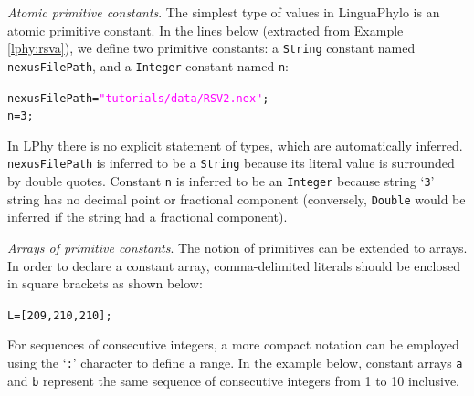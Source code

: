 \documentclass[10pt,letterpaper,table]{article}
\begin{document}
\noindent \emph{Atomic primitive constants}. The simplest type of
values in LinguaPhylo is an atomic primitive constant.
In the lines below (extracted from Example \ref{lphy:rsva}), we define
two primitive constants: a \texttt{String} constant named
\texttt{nexusFilePath}, and a \texttt{Integer} constant named
\texttt{n}:

{
\small
\begin{alltt}
  nexusFilePath = \textcolor{magenta}{"tutorials/data/RSV2.nex"};
  n = 3;
\end{alltt}
}

In LPhy there is no explicit statement of types, which are
automatically inferred.
\texttt{nexusFilePath} is inferred to be a \texttt{String} because its
literal value is surrounded by double quotes.
Constant \texttt{n} is inferred to be an \texttt{Integer} because
string `\texttt{3}' string has no decimal point or fractional component
(conversely, \texttt{Double} would be inferred if 
the string had a fractional component).\newline




\noindent \emph{Arrays of primitive constants}. The notion of primitives
can be extended to arrays.
In order to declare a constant array, comma-delimited literals should
be enclosed in square brackets as shown below:

{\small
  \begin{alltt}
    L = [209, 210, 210];
  \end{alltt}  
}

For sequences of consecutive integers, a more compact notation can be
employed using the `\texttt{:}' character to define a range.
In the example below, constant arrays \texttt{a} and \texttt{b}
represent the same sequence of consecutive integers from 1 to 10
inclusive.
\end{document}
